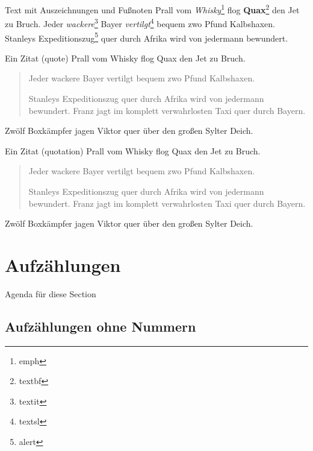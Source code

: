 	\begin{frame}{Text mit Auszeichnungen und Fußnoten}
		Prall vom \emph{Whisky}\footnote{emph} flog \textbf{Quax}\footnote{textbf} den Jet zu Bruch.
		Jeder \textit{wackere}\footnote{textit} Bayer \textsl{vertilgt}\footnote{textsl} bequem zwo Pfund Kalbshaxen.
		Stanleys \alert{Expeditionszug}\footnote{alert} quer durch Afrika wird von jedermann bewundert.
	\end{frame}

	\begin{frame}{Ein Zitat (quote)}
		Prall vom Whisky flog Quax den Jet zu Bruch.

		\begin{quote}
			Jeder wackere Bayer vertilgt bequem zwo Pfund Kalbshaxen.

			Stanleys Expeditionszug quer durch Afrika wird von jedermann bewundert.
			Franz jagt im komplett verwahrlosten Taxi quer durch Bayern.
		\end{quote}

		Zwölf Boxkämpfer jagen Viktor quer über den großen Sylter Deich.
	\end{frame}

	\begin{frame}{Ein Zitat (quotation)}
		Prall vom Whisky flog Quax den Jet zu Bruch.

		\begin{quotation}
			Jeder wackere Bayer vertilgt bequem zwo Pfund Kalbshaxen.

			Stanleys Expeditionszug quer durch Afrika wird von jedermann bewundert.
			Franz jagt im komplett verwahrlosten Taxi quer durch Bayern.
		\end{quotation}

		Zwölf Boxkämpfer jagen Viktor quer über den großen Sylter Deich.
	\end{frame}

	\section{Aufzählungen}

	\begin{frame}{Agenda für diese Section}
		\tableofcontents[currentsection]
	\end{frame}

	\subsection{Aufzählungen ohne Nummern}


